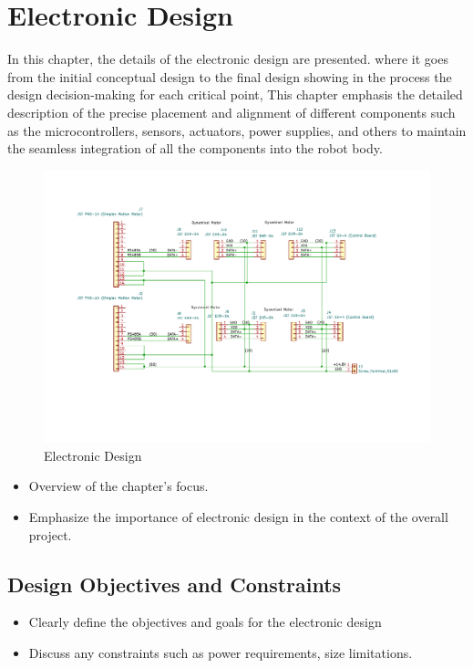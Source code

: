 \chapter{Electronic Design}

\graphicspath{{./Figures/Electronic Design/}}
In this chapter, the details of the electronic design are presented. where it goes from the initial conceptual design to the final design showing in the process the design decision-making for each critical point, This chapter emphasis the detailed description of the precise placement and alignment of different components such as the microcontrollers, sensors, actuators, power supplies, and others to maintain the seamless integration of all the components into the robot body.
\begin{figure}[h]
	\centering
	\includegraphics[width=1\linewidth]{Legged_TWIPR_Wiring_Tree}
	\caption[between brakets for delectronic design second test ]{Electronic Design}
	\label{fig:electronicdesign}
\end{figure}
\begin{itemize}
	\item Overview of the chapter's focus.
	\item Emphasize the importance of electronic design in the context of the overall project.
\end{itemize}


\section{Design Objectives and Constraints}
\begin{itemize}
	\item Clearly define the objectives and goals for the electronic design
	\item Discuss any constraints such as power requirements, size limitations.
\end{itemize}
